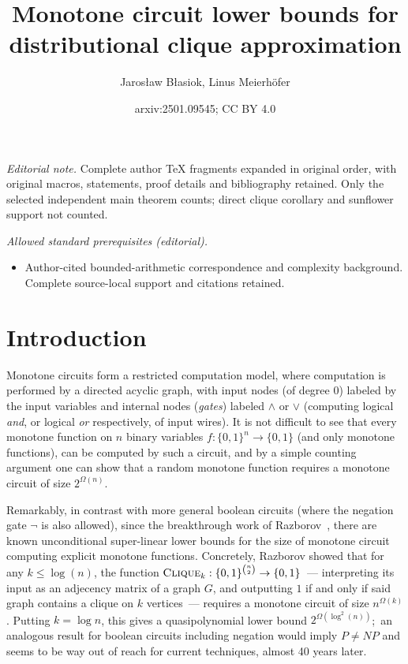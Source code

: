 \documentclass[10pt,a4paper]{article}
\title{Monotone circuit lower bounds for distributional clique approximation}
\author{Jarosław Błasiok, Linus Meierhöfer}
\date{arxiv:2501.09545; CC BY 4.0}
\newcommand{\cliquep}{\textsc{Clique}}
\begin{document}
\maketitle
\noindent\textit{Editorial note.} Complete author TeX fragments expanded in original order, with original macros, statements, proof details and bibliography retained. Only the selected independent main theorem counts; direct clique corollary and sunflower support not counted.\par\medskip
\noindent\textit{Allowed standard prerequisites (editorial).}\begin{itemize}
\item Author-cited bounded-arithmetic correspondence and complexity background. Complete source-local support and citations retained.
\end{itemize}\medskip
\section{Introduction}
Monotone circuits form a restricted computation model, where computation is performed by a directed acyclic graph, with input nodes (of degree $0$) labeled by the input variables and internal nodes (\emph{gates}) labeled $\land$ or $\lor$ (computing logical \emph{and}, or logical \emph{or} respectively, of input wires). It is not difficult to see that every monotone function on $n$ binary variables $f:\{0, 1\}^n \to \{0, 1\}$ (and only monotone functions), can be computed by such a circuit, and by a simple counting argument one can show that a random monotone function requires a monotone circuit of size $2^{\Omega(n)}$. 

Remarkably, in contrast with more general boolean circuits (where the negation gate $\lnot$ is also allowed), since the breakthrough work of Razborov~\cite{razborov1985lower}, there are known unconditional super-linear lower bounds for the size of monotone circuit computing explicit monotone functions. Concretely, Razborov showed that for any $k \leq \log(n)$, the function $\cliquep_k : \{0,1\}^{\binom{n}{2}} \to \{0,1\}$~--- interpreting its input as an adjecency matrix of a graph $G$, and outputting $1$ if and only if said graph contains a clique on $k$ vertices~--- requires a monotone circuit of size $n^{\Omega(k)}$. Putting $k = \log n$, this gives a quasipolynomial lower bound $2^{\Omega(\log^2(n))}$;~an analogous result for boolean circuits including negation would imply $P \not=NP$ and seems to be way out of reach for current techniques, almost 40 years later.
\end{document}

